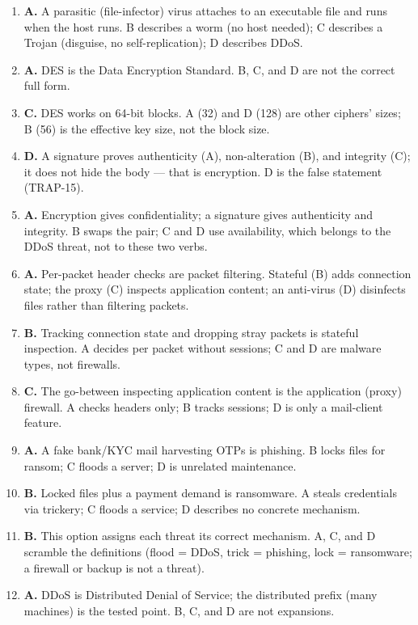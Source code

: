 \begin{enumerate}[label=\textbf{Q\arabic*.}, leftmargin=*]
\item \textbf{A.} A parasitic (file-infector) virus attaches to an executable
  file and runs when the host runs. B describes a worm (no host needed); C
  describes a Trojan (disguise, no self-replication); D describes DDoS.
\item \textbf{A.} DES is the Data Encryption Standard. B, C, and D are not
  the correct full form.
\item \textbf{C.} DES works on 64-bit blocks. A (32) and D (128) are other
  ciphers' sizes; B (56) is the effective key size, not the block size.
\item \textbf{D.} A signature proves authenticity (A), non-alteration (B),
  and integrity (C); it does not hide the body --- that is encryption. D is
  the false statement (TRAP-15).
\item \textbf{A.} Encryption gives confidentiality; a signature gives
  authenticity and integrity. B swaps the pair; C and D use availability,
  which belongs to the DDoS threat, not to these two verbs.
\item \textbf{A.} Per-packet header checks are packet filtering. Stateful (B)
  adds connection state; the proxy (C) inspects application content; an
  anti-virus (D) disinfects files rather than filtering packets.
\item \textbf{B.} Tracking connection state and dropping stray packets is
  stateful inspection. A decides per packet without sessions; C and D are
  malware types, not firewalls.
\item \textbf{C.} The go-between inspecting application content is the
  application (proxy) firewall. A checks headers only; B tracks sessions; D
  is only a mail-client feature.
\item \textbf{A.} A fake bank/KYC mail harvesting OTPs is phishing. B locks
  files for ransom; C floods a server; D is unrelated maintenance.
\item \textbf{B.} Locked files plus a payment demand is ransomware. A steals
  credentials via trickery; C floods a service; D describes no concrete
  mechanism.
\item \textbf{B.} This option assigns each threat its correct mechanism. A, C,
  and D scramble the definitions (flood = DDoS, trick = phishing, lock =
  ransomware; a firewall or backup is not a threat).
\item \textbf{A.} DDoS is Distributed Denial of Service; the distributed
  prefix (many machines) is the tested point. B, C, and D are not expansions.

\end{enumerate}
